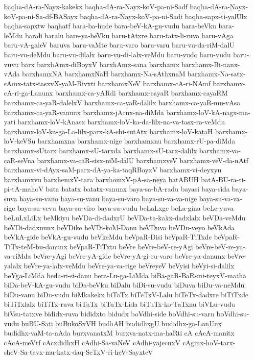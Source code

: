{baqha-dA-ra-Nayx-kakekx
baqha-dA-ra-Nayx-koV-pa-ni-Sadf
baqha-dA-ra-Nayx-koV-pa-ni-Sa-df-BASayx
baqha-dA-ra-Nayx-koV-pa-ni-Sadi
baqha-sapx-ti-yalUlx
baqha-sapxtw
baqhatf
bara-ba-hude
bara-beV-kA-gu-vudu
bara-beVku
bara-leMdu
barali
baralu
bare-ya-beVku
baru-tAtxre
baru-tatx-li-ruva
baru-vAga
baru-vA-galeV
baruva
baru-vaMte
baru-varo
baru-varu
baru-vu-da-riM-dalU
baru-vu-deMdu
baru-vu-dilalx
baru-vu-di-lalx-veMdu
baru-vudo
baru-vudu
baru-vuvu
barx
barxhAmx-diBoyxV
barxhAmx-sana
barxhamx
barxhamx-Bi-nanx-vAda
barxhamxNA
barxhamxNaH
barxhamx-Na-sAthxnaM
barxhamx-Na-satx-sAmx-tatx-tasxvX-yaM-Bivxti
barxhamxNeV
barxhamx-cA-ri-NAmf
barxhamx-cA-ri-ga-Lanunx
barxhamx-ca-yARdi
barxhamx-cayaR
barxhamx-cayaRM
barxhamx-ca-yaR-dalelxV
barxhamx-ca-yaR-dalilx
barxhamx-ca-yaR-mu-vAsa
barxhamx-ca-yaR-vanunx
barxhamx-jAcnx-na-diMda
barxhamx-loV-kA-nagx-ma-yati
barxhamx-loV-kAnasx
barxhamx-loV-ka-da-lilx-na-va-tasx-ra-veMdu
barxhamx-loV-ka-ga-La-lilx-parx-kA-shi-sutAtx
barxhamx-loV-kataH
barxhamx-loV-keVSu
barxhamxna
barxhamx-nige
barxhamxnu
barxhamx-rU-pa-diMda
barxhamx-sUtarx
barxhamx-sU-tarxda
barxhamx-sU-tarx-dalilx
barxhamx-va-caR-seVna
barxhamx-va-caR-sisx-niM-dalU
barxhamxveV
barxhamx-veV-da-nAtf
barxhamx-vi-dAyx-saM-parx-dA-ya-ka-taqRBoyxV
barxhamx-vi-deyxyu
barxhamxvu
barxhemxV-tara
barxhomxV-pA-sa-neya
batABUH
batA-BU-ra-ti-pi-tA-mahoV
bata
batatx
batatx-vanunx
baya-sa-bA-radu
bayasi
baya-sida
baya-suva
baya-su-vano
baya-su-vanu
baya-su-varo
baya-su-va-va-nige
baya-su-va-va-rige
baya-su-vevu
baya-su-viro
baya-su-vudu
beLaLxge
beLa-gina
beLe-yuva
beLuLxLiLx
beMkiyu
beVDa-di-dadxrU
beVDa-ta-kakx-dadxlalx
beVDa-veMdu
beVDi-dadxnunx
beVDike
beVDi-koM-Danu
beVDuva
beVDu-veyo
beVkAda
beVkA-gide
beVkA-gu-vudu
beVkeMdu
beVpaR-Disi
beVpaR-TiTxde
beVpaR-TiTx-teM-bu-danunx
beVpaR-TiTxtu
beVre
beVre-beV-re-yAgi
beVre-beV-re-ya-va-riMda
beVre-yAgi
beVre-yA-gide
beVre-yA-gi-ru-varo
beVre-ya-danunx
beVre-yalalx
beVre-ya-lalx-veMdu
beVre-ya-va-rige
beVreyeV
beVyisi
beVyi-si-dalilx
beYga-LiMda
beda-ri-si-danu
bera-Lu-ga-LiMda
biBa-gaR-BaR-mi-teyxV-matha
biDa-beV-kA-gu-vudu
biDa-beVku
biDalu
biDi-su-vudu
biDuva
biDu-va-neMdu
biDu-vanu
biDu-vudu
biMkakekx
biTaTx
biTeTxV-Lalu
biTeTx-dadxre
biTiTxde
biTiTxlalx
biTiTx-ruva
biTuTx
biTuTx-Lida
biTuTx-ko-TaTxnu
biVLu-vudu
biVsu-tatxve
bididx-ruva
bididxto
bidudx
boVdhi-side
boVdhi-su-varu
boVdhi-su-vudu
buBU-Sati
buBukoSxVH
budhAH
budidhxgU
budidhx-ga-LanUnx
budidhx-vaM-ta-nAda
burxvanatxM
burxva-natx-ma-haRti
cA
cAcA-manitx
cAcA-meVtf
cAcxdidhxH
cAdhi-Sa-vaNeV
cAdhi-yajecnxV
cAginx-hoV-tarx-sheV-Sa-tavx-mu-katx-daq-SeTxV-ri-heV-SayxteV
}
